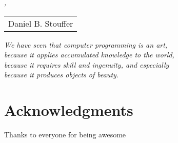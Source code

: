 \bigskip

\noindent\textit{\myLocation, \myTime}

\smallskip

\begin{flushright}
    \begin{tabular}{m{5cm}}
        \\ \hline
        \centering Daniel B. Stouffer \\
    \end{tabular}
\end{flushright}


\cleardoublepage
{}

\begin{flushright}{\slshape
    We have seen that computer programming is an art, \\
    because it applies accumulated knowledge to the world, \\
    because it requires skill and ingenuity, and especially \\
    because it produces objects of beauty.} \\ \medskip
\end{flushright}



\bigskip

\begingroup
\let\clearpage\relax
\let\cleardoublepage\relax
\let\cleardoublepage\relax
\chapter*{Acknowledgments}
Thanks to everyone for being awesome

\endgroup
\pagestyle{scrheadings}
{}
\setcounter{tocdepth}{1} %
\setcounter{secnumdepth}{3} %
\manualmark
\markboth{\spacedlowsmallcaps{\contentsname}}{\spacedlowsmallcaps{\contentsname}}
\tableofcontents
{}
\renewcommand{\chaptermark}[1]{\markboth{\spacedlowsmallcaps{#1}}{\spacedlowsmallcaps{#1}}}
\renewcommand{\sectionmark}[1]{\markright{\textsc{\thesection}\enspace\spacedlowsmallcaps{#1}}}
\clearpage
\begingroup
    \let\clearpage\relax
    \let\cleardoublepage\relax
    \listoffigures

